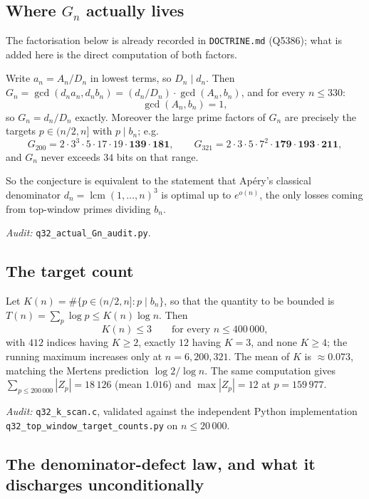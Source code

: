 \subsection{Where $G_n$ actually lives}

The factorisation below is already recorded in \texttt{DOCTRINE.md} (Q5386); what is added
here is the direct computation of both factors.

\begin{proposition}\label{prop:Gn}
Write $a_n=A_n/D_n$ in lowest terms, so $D_n\mid d_n$.  Then
$G_n=\gcd(d_na_n,d_nb_n)=(d_n/D_n)\cdot\gcd(A_n,b_n)$, and for every $n\le330$:
\[
  \gcd(A_n,b_n)=1,
\]
so $G_n=d_n/D_n$ exactly.  Moreover the large prime factors of $G_n$ are precisely the
targets $p\in(n/2,n]$ with $p\mid b_n$; e.g.
\[
  G_{200}=2\cdot3^3\cdot5\cdot17\cdot19\cdot\mathbf{139}\cdot\mathbf{181},\qquad
  G_{321}=2\cdot3\cdot5\cdot7^2\cdot\mathbf{179}\cdot\mathbf{193}\cdot\mathbf{211},
\]
and $G_n$ never exceeds $34$ bits on that range.
\end{proposition}

So the conjecture is equivalent to the statement that Ap\'ery's classical denominator
$d_n=\operatorname{lcm}(1,\dots,n)^3$ is optimal up to $e^{o(n)}$, the only losses coming from
top-window primes dividing $b_n$.

\noindent\emph{Audit:} \texttt{q32\_actual\_Gn\_audit.py}.

\subsection{The target count}

\begin{proposition}\label{prop:K}
Let $K(n)=\#\{p\in(n/2,n]:p\mid b_n\}$, so that the quantity to be bounded is
$T(n)=\sum_{p}\log p\le K(n)\log n$.  Then
\[
  K(n)\le3\qquad\text{for every }n\le400\,000,
\]
with $412$ indices having $K\ge2$, exactly $12$ having $K=3$, and none $K\ge4$; the running
maximum increases only at $n=6,200,321$.  The mean of $K$ is $\approx0.073$, matching the
Mertens prediction $\log2/\log n$.  The same computation gives
$\sum_{p\le200\,000}|Z_p|=18\,126$ (mean $1.016$) and $\max|Z_p|=12$ at $p=159\,977$.
\end{proposition}

\noindent\emph{Audit:} \texttt{q32\_k\_scan.c}, validated against the independent Python
implementation \texttt{q32\_top\_window\_target\_counts.py} on $n\le20\,000$.

\subsection{The denominator-defect law, and what it discharges unconditionally}
\label{subsec:defect-law}

